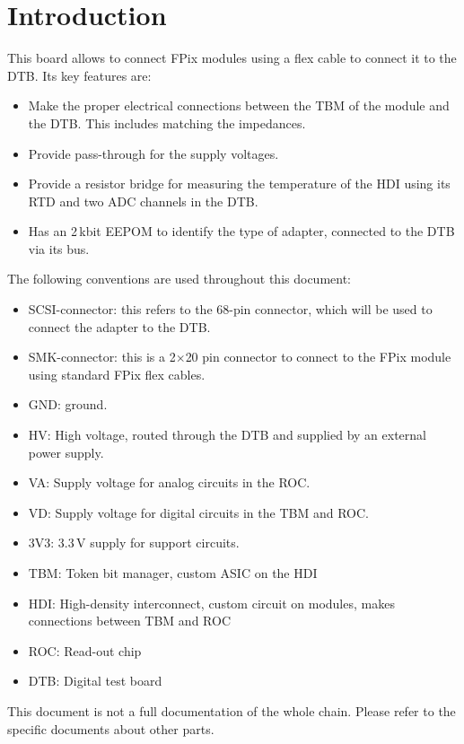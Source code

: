 \chapter{Introduction}

This board allows to connect FPix modules using a flex cable to connect it to the DTB. Its key features are:
\begin{itemize}
    \item Make the proper electrical connections between the TBM of the module and the DTB. This includes matching the impedances.
    \item Provide pass-through for the supply voltages.
    \item Provide a resistor bridge for measuring the temperature of the HDI using its RTD and two ADC channels in the DTB.
    \item Has an 2\,kbit EEPOM to identify the type of adapter, connected to the DTB via its \isqc{} bus.
\end{itemize}

The following conventions are used throughout this document:
\begin{itemize}
    \item SCSI-connector: this refers to the 68-pin connector, which will be used to connect the adapter to the DTB.
    \item SMK-connector: this is a 2$\times$20 pin connector to connect to the FPix module using standard FPix flex cables.
    \item GND: ground.
    \item HV: High voltage, routed through the DTB and supplied by an external power supply.
    \item VA: Supply voltage for analog circuits in the ROC.
    \item VD: Supply voltage for digital circuits in the TBM and ROC.
    \item 3V3: 3.3\,V supply for support circuits.
    \item TBM: Token bit manager, custom ASIC on the HDI
    \item HDI: High-density interconnect, custom circuit on modules, makes connections between TBM and ROC
    \item ROC: Read-out chip
    \item DTB: Digital test board
\end{itemize}
This document is not a full documentation of the whole chain. Please refer to the specific documents about other parts.

